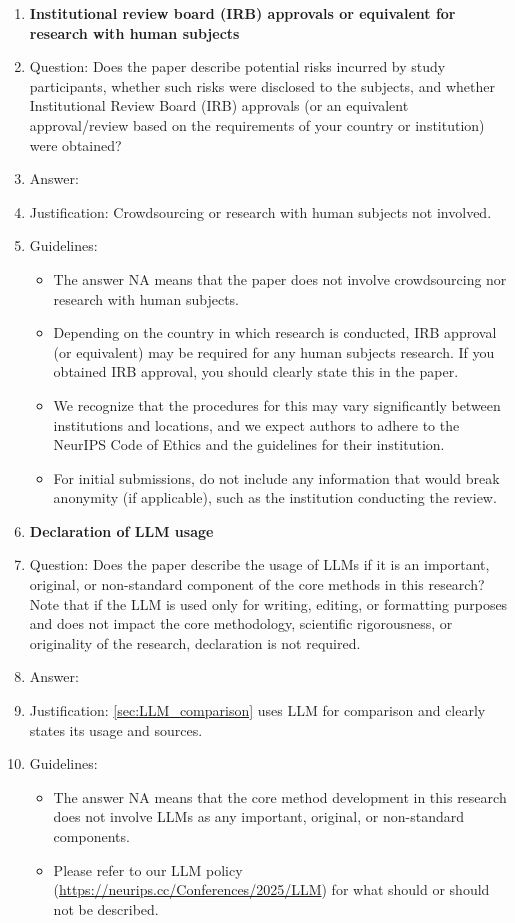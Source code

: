 \documentclass{article}
\begin{document}
\begin{enumerate}
\item {\bf Institutional review board (IRB) approvals or equivalent for research with human subjects}
    \item[] Question: Does the paper describe potential risks incurred by study participants, whether such risks were disclosed to the subjects, and whether Institutional Review Board (IRB) approvals (or an equivalent approval/review based on the requirements of your country or institution) were obtained?
    \item[] Answer: \answerNA{} %
    \item[] Justification: Crowdsourcing or research with human subjects not involved.
    \item[] Guidelines:
    \begin{itemize}
        \item The answer NA means that the paper does not involve crowdsourcing nor research with human subjects.
        \item Depending on the country in which research is conducted, IRB approval (or equivalent) may be required for any human subjects research. If you obtained IRB approval, you should clearly state this in the paper. 
        \item We recognize that the procedures for this may vary significantly between institutions and locations, and we expect authors to adhere to the NeurIPS Code of Ethics and the guidelines for their institution. 
        \item For initial submissions, do not include any information that would break anonymity (if applicable), such as the institution conducting the review.
    \end{itemize}

\item {\bf Declaration of LLM usage}
    \item[] Question: Does the paper describe the usage of LLMs if it is an important, original, or non-standard component of the core methods in this research? Note that if the LLM is used only for writing, editing, or formatting purposes and does not impact the core methodology, scientific rigorousness, or originality of the research, declaration is not required.
    \item[] Answer: \answerYes{} %
    \item[] Justification: \cref{sec:LLM_comparison} uses LLM for comparison and clearly states its usage and sources.
    \item[] Guidelines:
    \begin{itemize}
        \item The answer NA means that the core method development in this research does not involve LLMs as any important, original, or non-standard components.
        \item Please refer to our LLM policy (\url{https://neurips.cc/Conferences/2025/LLM}) for what should or should not be described.
    \end{itemize}

\end{enumerate}
\end{document}
